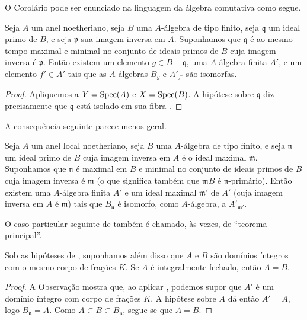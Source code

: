 O Corolário  pode ser enunciado na linguagem da
álgebra comutativa como segue.

\begin{corollary}[4.4.6]
\label{III.4.4.6}
Seja $A$ um anel noetheriano, seja $B$ uma $A$-álgebra de tipo
finito, seja $\mathfrak q$ um ideal primo de $B$, e seja $\mathfrak p$
sua imagem inversa em $A$. Suponhamos que $\mathfrak q$ é ao mesmo tempo
maximal e minimal no conjunto de ideais primos de $B$ cuja imagem
inversa é $\mathfrak p$. Então existem um elemento
$g\in B-\mathfrak q$, uma $A$-álgebra finita $A'$, e um elemento
$f'\in A'$ tais que as $A$-álgebras $B_g$ e $A'_{f'}$ são
isomorfas.
\end{corollary}

\begin{proof}
Apliquemos  a $Y=\operatorname{Spec}(A)$ e $X=\operatorname{Spec}(B)$. A
hipótese sobre $\mathfrak q$ diz precisamente que $\mathfrak q$
está isolado em sua fibra .
\end{proof}

A consequência seguinte parece menos geral.


\begin{corollary}[4.4.7]
\label{III.4.4.7}
Seja $A$ um anel local noetheriano, seja $B$ uma $A$-álgebra de tipo
finito, e seja $\mathfrak n$ um ideal primo de $B$ cuja imagem inversa
em $A$ é o ideal maximal $\mathfrak m$. Suponhamos que $\mathfrak n$
é maximal em $B$ e minimal no conjunto de ideais primos de $B$
cuja imagem inversa é $\mathfrak m$ (o que significa também que
$\mathfrak mB$ é $\mathfrak n$-primário). Então existem uma
$A$-álgebra finita $A'$ e um ideal maximal $\mathfrak m'$ de $A'$
(cuja imagem inversa em $A$ é $\mathfrak m$) tais que $B_{\mathfrak
n}$ é isomorfo, como $A$-álgebra, a $A'_{\mathfrak m'}$.
\end{corollary}

O caso particular seguinte de  também é chamado, às
vezes, de ``teorema principal''.

\begin{corollary}[4.4.8]
\label{III.4.4.8}
Sob as hipóteses de , suponhamos além disso que $A$ e
$B$ são domínios íntegros com o mesmo corpo de frações $K$.
Se $A$ é integralmente fechado, então $A=B$.
\end{corollary}

\begin{proof}
A Observação  mostra que, ao aplicar
, podemos supor que $A'$ é um domínio íntegro com
corpo de frações $K$. A hipótese sobre $A$ dá então
$A'=A$, logo $B_{\mathfrak n}=A$. Como
$A\subset B\subset B_{\mathfrak n}$, segue-se que $A=B$.
\end{proof}

